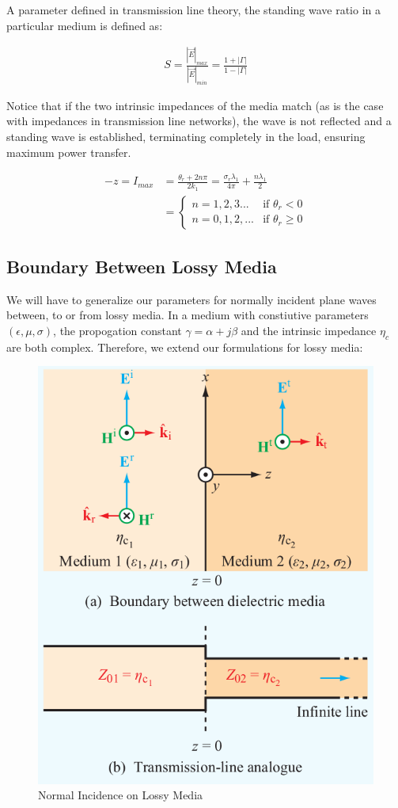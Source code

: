 \documentclass{book}
\begin{document}
A parameter defined in transmission line theory, the standing wave ratio in a particular medium is defined as:

\begin{align*}
	S = \frac{|\vec{E}|_{max}}{|\vec{E}|_{min}} = \frac{1 + |\Gamma|}{1-|\Gamma|}
\end{align*}

Notice that if the two intrinsic impedances of the media match (as is the case with impedances in transmission line networks), the wave is not reflected and a standing wave is established, terminating completely in the load, ensuring maximum power transfer. 

\begin{align*}
	-z = I_{max} &= \frac{\theta_r + 2n\pi}{2k_1} = \frac{\sigma_r \lambda_1}{4 \pi} + \frac{n \lambda_1}{2} \\
	&= \begin{cases}
		n = 1,2,3... & \text{if } \theta_r < 0 \\
		n=0,1,2,... & \text{if } \theta_r \geq 0
	\end{cases}
\end{align*}

\subsection{Boundary Between Lossy Media}

We will have to generalize our parameters for normally incident plane waves between, to or from lossy media. In a medium with constiutive parameters $(\epsilon, \mu, \sigma)$, the propogation constant $\gamma = \alpha + j \beta$ and the intrinsic impedance $\eta_c$ are both complex. Therefore, we extend our formulations for lossy media:


\begin{figure}[h]
	\centering
	\includegraphics[width=0.5\linewidth]{Screenshots/lossy_media_incidence}
	\caption{Normal Incidence on Lossy Media}
	\label{fig:lossymediaincidence}
\end{figure}
\end{document}
